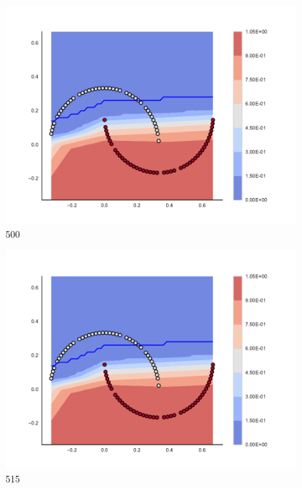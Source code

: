 \begin{subfigure}[b]{0.09\textwidth}
    \includegraphics[clip, trim=2.35cm 1.75cm 4.5cm 0cm,width=\textwidth]{img/convergence/500.pdf}
    \caption{500}
    \label{fig:convergence_500}
\end{subfigure}
%
\begin{subfigure}[b]{0.09\textwidth}
    \includegraphics[clip, trim=2.35cm 1.75cm 4.5cm 0cm,width=\textwidth]{img/convergence/515.pdf}
    \caption{515}
    \label{fig:convergence_515}
\end{subfigure}
%
